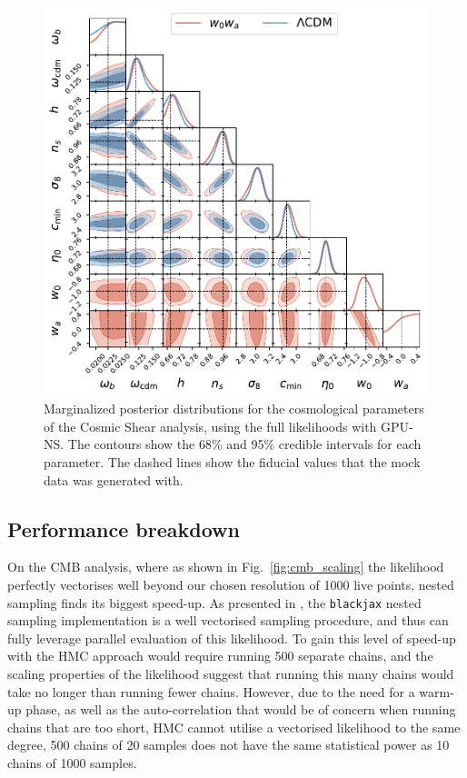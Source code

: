 \documentclass[twocolumn]{openjournal}
\begin{document}
\begin{figure}
    \centering
    \includegraphics[width=0.95\linewidth]{w0wa_lcdm.pdf}
    \caption{Marginalized posterior distributions for the cosmological parameters of the Cosmic Shear analysis, using the full likelihoods with GPU-NS. The contours show the 68\% and 95\% credible intervals for each parameter. The dashed lines show the fiducial values that the mock data was generated with.}
    \label{shearmarg}
\end{figure}

\subsection{Performance breakdown}
On the CMB analysis, where as shown in Fig.~\ref{fig:cmb_scaling} the likelihood perfectly vectorises well beyond our chosen resolution of 1000 live points, nested sampling finds its biggest speed-up. As presented in \cite{NSSyallup}, the \texttt{blackjax} nested sampling implementation is a well vectorised sampling procedure, and thus can fully leverage parallel evaluation of this likelihood. To gain this level of speed-up with the HMC approach would require running 500 separate chains, and the scaling properties of the likelihood suggest that running this many chains would take no longer than running fewer chains. However, due to the need for a warm-up phase, as well as the auto-correlation that would be of concern when running chains that are too short, HMC cannot utilise a vectorised likelihood to the same degree, 500 chains of 20 samples does not have the same statistical power as 10 chains of 1000 samples.
\end{document}
